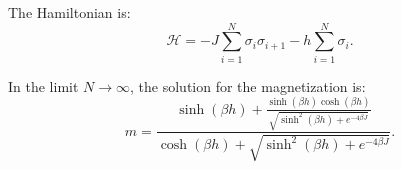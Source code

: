 \documentclass[a4paper] {article}
\begin{document}
The Hamiltonian is:
\begin{equation}
\mathcal{H} = -J \sum_{i=1}^N \sigma_i \sigma_{i+1} - h \sum_{i=1}^N \sigma_i.
\end{equation}

In the limit $N\rightarrow \infty$, the solution for the magnetization is:
\begin{equation}
m = \frac{\sinh(\beta h) + \frac{\sinh(\beta h)\cosh(\beta h)}{\sqrt{\sinh^2(\beta h) + e^{-4\beta J}}}}
         {\cosh(\beta h) + \sqrt{\sinh^2(\beta h) + e^{-4\beta J}}}.
\end{equation}
\end{document}
